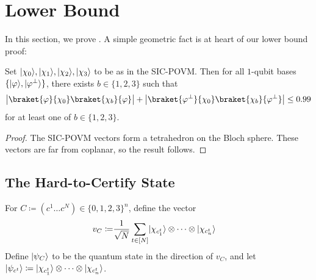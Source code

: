 


\section{Lower Bound}\label{sec:lower bound}
In this section, we prove .
A simple geometric fact is at heart of our lower bound proof:
\begin{claim}\label{claim:uncertainty one particle}
    Set $\lvert\chi_0\rangle, \lvert\chi_1\rangle, \lvert\chi_2\rangle, \lvert\chi_3\rangle$ to be as in the SIC-POVM. Then for all $1$-qubit bases $\{\lvert\varphi\rangle, \lvert\varphi^\bot\rangle\}$, there exists $b \in \{1,2,3\}$ such that
    \begin{equation*}
        \abs{\braket{\phi}{\chi_0}\braket{\chi_b}{\phi}}+ \abs{\braket{\smash{\phi^\perp}}{\chi_0}\braket{\chi_b}{\smash{\phi^\perp}}} \leq 0.99
    \end{equation*}
    for at least one of $b\in\{1,2,3\}$.
\end{claim}
\begin{proof}
    The SIC-POVM vectors form a tetrahedron on the Bloch sphere. These vectors are far from coplanar, so the result follows.
\end{proof}


\subsection{The Hard-to-Certify State}
\begin{definition}
    For $C \coloneqq (c^1\ldots c^N) \in \{0,1,2,3\}^n$, define the vector 
    \begin{align*}
        v_C\coloneq& \frac1{\sqrt{N}} \sum_{t\in[N]} \lvert\smash{\chi_{c^t_1}}\rangle\otimes\dots\otimes \lvert\smash{\chi_{c^t_n}}\rangle
    \end{align*}
    Define $\lvert\psi_C\rangle$ to be the quantum state in the direction of $v_C$, and let $\lvert\psi_{c^t}\rangle\coloneq \lvert\smash{\chi_{c^t_1}}\rangle\otimes\dots\otimes \lvert\smash{\chi_{c^t_n}}\rangle$.
\end{definition}

